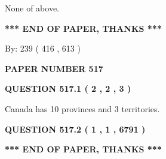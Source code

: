\documentclass[12pt]{article}
\begin{document}
 
 None of above.
 
 
 
 
   
   
 \vspace{0.2in}
 
   
   
   
   
\vspace{1.0in} 
{\textbf{\large{ *** END OF PAPER, THANKS *** }}} 
   
   
\hspace{1.0in} By: 
 239 ( 416 ,  613 )
   
   
   
   
\newpage 
\setcounter{page}{ 
   517001 } 
   
   
   
   
 {\textbf{ \Large{ PAPER NUMBER  517  }}}
   
   
\vspace{0.2in}
   
   
   
   
   
   
 \vspace{0.2in}
 
 
 
 
   
   
  
\vspace{0.2in}
  
{\textbf{\Large{QUESTION
517.1 
 ( 2 , 2 , 3 )
}}}
  
  
 
 
\noindent{}
 
 
Canada has 10  provinces and 3 territories.
 
 
 
 
  
\vspace{0.2in}
  
{\textbf{\Large{QUESTION
517.2 
 ( 1 , 1 , 6791 )
}}}
  
  
   
   
 \vspace{0.2in}
 
   
   
   
   
\vspace{1.0in} 
{\textbf{\large{ *** END OF PAPER, THANKS *** }}} 
   
\end{document}
